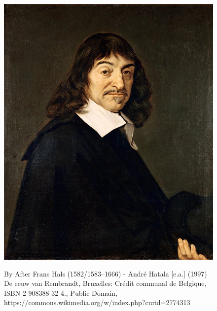 
\blankscreen{
}

\begin{frame}{}
    \begin{figure}
        \includegraphics[scale=0.2]{images/descartes}

        \footnotesize{By After Frans Hals (1582/1583–1666) - André Hatala [e.a.] (1997) De eeuw van Rembrandt, Bruxelles: Crédit communal de Belgique, ISBN 2-908388-32-4., Public Domain, https://commons.wikimedia.org/w/index.php?curid=2774313}
    \end{figure}
\end{frame}

